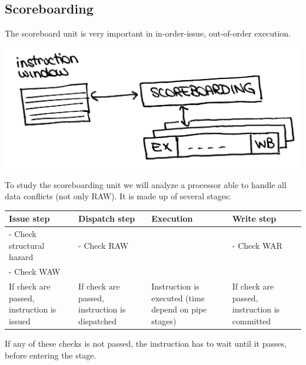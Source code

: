 \subsection {Scoreboarding}
The scoreboard unit is very important in in-order-issue, out-of-order execution.
\begin{center}
  \includegraphics[width=0.7\linewidth]{img/img3/11}
\end{center}
To study the scoreboarding unit we will analyze a processor able to handle all
data conflicts (not only RAW). It is made up of several stages:
\begin{center}
  \begin{tabular}{|m{4.5cm}|m{4cm}|m{4cm}|m{4cm}|}
    \hline
    \textbf{Issue step}& \textbf{Dispatch step} &
    \textbf{Execution} & \textbf{Write step}\\
    \hline
    - Check structural hazard & - Check RAW & & - Check WAR\\
    - Check WAW & & &\\
    \hline
    If check are passed, instruction is issued &
    If check are passed, instruction is dispatched &
    Instruction is executed (time depend on pipe stages) &
    If check are passed, instruction is committed\\
    \hline
  \end{tabular}
\end{center}
If any of these checks is not passed, the instruction has to wait until it
passes, before entering the stage.

